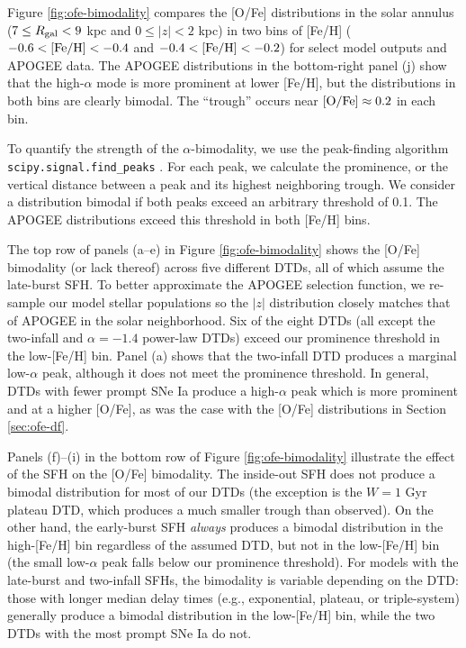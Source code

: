 \documentclass[twocolumn,twocolappendix,linenumbers]{aastex631}
\begin{document}
Figure \ref{fig:ofe-bimodality} compares the [O/Fe] distributions in the solar annulus ($7\leq R_{\rm gal}<9$ kpc and $0\leq|z|<2$ kpc) in two bins of [Fe/H] ($-0.6<{\rm [Fe/H]}<-0.4$ and $-0.4<{\rm [Fe/H]}<-0.2$) for select model outputs and APOGEE data. The APOGEE distributions in the bottom-right panel (j) show that the high-$\alpha$ mode is more prominent at lower [Fe/H], but the distributions in both bins are clearly bimodal. The ``trough'' occurs near ${\rm [O/Fe]}\approx0.2$ in each bin.

To quantify the strength of the $\alpha$-bimodality, we use the peak-finding algorithm {\tt scipy.signal.find\_peaks} \citep{2020SciPy-NMeth}. For each peak, we calculate the prominence, or the vertical distance between a peak and its highest neighboring trough. We consider a distribution bimodal if both peaks exceed an arbitrary threshold of 0.1. The APOGEE distributions exceed this threshold in both [Fe/H] bins.

The top row of panels (a--e) in Figure \ref{fig:ofe-bimodality} shows the [O/Fe] bimodality (or lack thereof) across five different DTDs, all of which assume the late-burst SFH. To better approximate the APOGEE selection function, we re-sample our model stellar populations so the $|z|$ distribution closely matches that of APOGEE in the solar neighborhood. Six of the eight DTDs (all except the two-infall and $\alpha=-1.4$ power-law DTDs) exceed our prominence threshold in the low-[Fe/H] bin. Panel (a) shows that the two-infall DTD produces a marginal low-$\alpha$ peak, although it does not meet the prominence threshold. In general, DTDs with fewer prompt SNe Ia produce a high-$\alpha$ peak which is more prominent and at a higher [O/Fe], as was the case with the [O/Fe] distributions in Section \ref{sec:ofe-df}. 

Panels (f)--(i) in the bottom row of Figure \ref{fig:ofe-bimodality} illustrate the effect of the SFH on the [O/Fe] bimodality. The inside-out SFH does not produce a bimodal distribution for most of our DTDs (the exception is the $W=1$ Gyr plateau DTD, which produces a much smaller trough than observed). On the other hand, the early-burst SFH {\it always} produces a bimodal distribution in the high-[Fe/H] bin regardless of the assumed DTD, but not in the low-[Fe/H] bin (the small low-$\alpha$ peak falls below our prominence threshold). For models with the late-burst and two-infall SFHs, the bimodality is variable depending on the DTD: those with longer median delay times (e.g., exponential, plateau, or triple-system) generally produce a bimodal distribution in the low-[Fe/H] bin, while the two DTDs with the most prompt SNe Ia do not. 
\end{document}
